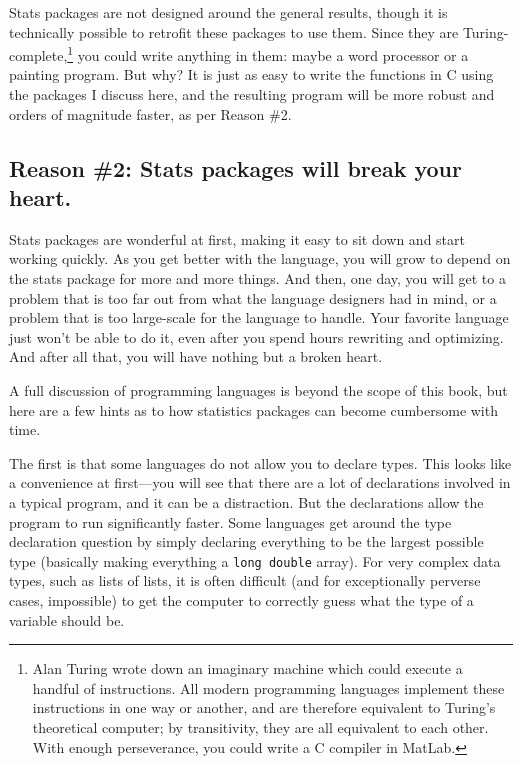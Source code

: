 Stats packages are not designed around the general results, though
it is technically possible to retrofit these packages to use them. Since
they are Turing-complete,\footnote{Alan Turing wrote down an imaginary
machine which could execute a handful of instructions.  All
modern programming languages implement these instructions in one way or
another, and are therefore equivalent to Turing's theoretical computer;
by transitivity, they are all equivalent to each other. With enough
perseverance, you could
write a C compiler in MatLab.} you could
write anything in them: maybe a word processor or a painting program. But
why? It is just as easy to write the functions in C using the packages I discuss
here, and the resulting program will be more robust and orders of
magnitude faster, as per Reason \#2.
	\fi

\subsection{Reason \#2: Stats packages will break your heart.} Stats packages
are wonderful at first, making it easy to sit down and start working
quickly. As you get better with the language, you will 
grow to depend on the stats package for more and more
things. And then, one day, you will get to a problem that is too far
out from what the language designers had in mind, or a problem that is
too large-scale for the language to handle. Your favorite language just
won't be able to do it, even after you spend hours rewriting and
optimizing.  And after all that,
you will have nothing but a broken heart.

A full discussion of programming languages is beyond the scope of this book, but
here are a few hints as to how statistics packages can become cumbersome with
time. 

The first is that some languages do not allow you to declare types. This
looks like a convenience at first---you will see that there are a
lot of declarations involved in a typical program, and it can be a
distraction. But the declarations allow the program to run significantly
faster. Some languages get around the type declaration question by simply
declaring everything to be the largest possible type (basically making
everything a {\tt long double} array).  For very complex data types,
such as lists of lists, it is often difficult (and for exceptionally
perverse cases, impossible) to get the computer to correctly guess what the
type of a variable should be.

